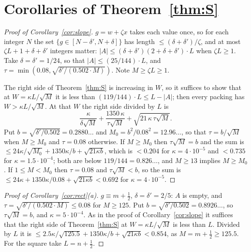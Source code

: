 \documentclass[11pt,letterpaper]{amsart}
\theoremstyle{plain}
\theoremstyle{definition}
\theoremstyle{remark}
\begin{document}
\section{Corollaries of Theorem~\ref{thm:S}}\label{sec:corollaries}
\begin{proof}[Proof of Corollary~\ref{cor:slope}]
$g=w+\zeta x$ takes each value once, so for each integer $N$ the set $\{g\in[N-\delta',N+\delta]\}$ has length $\le(\delta+\delta')/\zeta$, and at most $\zeta L+1+\delta+\delta'$ integers matter: $|A|\le(\delta+\delta')(2+\delta+\delta')\cdot L$ when $\zeta L\ge1$. Take $\delta=\delta'=1/24$, so that $|A|\le(25/144)\cdot L$, and $\tau=\min(0.08,\sqrt{\delta'/(0.502\cdot M)})$. Note $M\ge\zeta L\ge1$.

The right side of Theorem~\ref{thm:S} is increasing in $W$, so it suffices to show that at $W=\kappa L/\sqrt M$ it is less than $(119/144)\cdot L\le L-|A|$; then every packing has $W>\kappa L/\sqrt M$. At that $W$ the right side divided by $L$ is
\[
\frac{\kappa}{\delta\sqrt M}+\frac{1350\,\kappa}{\tau\sqrt M}+\sqrt{21\,\kappa\,\tau\sqrt M}.
\]
Put $b=\sqrt{\delta'/0.502}=0.2880\ldots$ and $M_0=b^2/0.08^2=12.96\ldots$, so that $\tau=b/\sqrt M$ when $M\ge M_0$ and $\tau=0.08$ otherwise. If $M\ge M_0$ then $\tau\sqrt M=b$ and the sum is $\le24\kappa/\sqrt{M_0}+1350\kappa/b+\sqrt{21\kappa b}$, which is $<0.204$ for $\kappa=4\cdot10^{-5}$ and $<0.735$ for $\kappa=1.5\cdot10^{-4}$; both are below $119/144=0.826\ldots$, and $M\ge13$ implies $M\ge M_0$. If $1\le M<M_0$ then $\tau=0.08$ and $\tau\sqrt M<b$, so the sum is $\le24\kappa+1350\kappa/0.08+\sqrt{21\kappa b}<0.692$ for $\kappa=4\cdot10^{-5}$.
\end{proof}

\begin{proof}[Proof of Corollary~\ref{cor:rect}(a)]
$g\equiv m+\tfrac12$, $\delta=\delta'=2/5$: $A$ is empty, and $\tau=\sqrt{\delta'/(0.502\cdot M)}\le0.08$ for $M\ge125$. Put $b=\sqrt{\delta'/0.502}=0.8926\ldots$, so $\tau\sqrt M=b$, and $\kappa=5\cdot10^{-4}$. As in the proof of Corollary~\ref{cor:slope} it suffices that the right side of Theorem~\ref{thm:S} at $W=\kappa L/\sqrt M$ is less than $L$. Divided by $L$ it is $\le2.5\kappa/\sqrt{125.5}+1350\kappa/b+\sqrt{21\kappa b}<0.854$, as $M=m+\tfrac12\ge125.5$. For the square take $L=n+\tfrac12$.
\end{proof}
\end{document}
